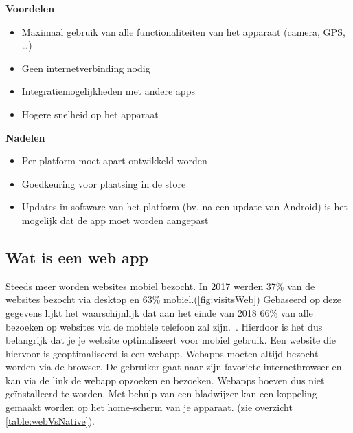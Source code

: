 \begin{minipage}[t]{0.5\textwidth}
	\textbf{Voordelen}
	\begin{itemize}  
		\item Maximaal gebruik van alle functionaliteiten van het apparaat (camera, GPS, \dots)
		\item Geen internetverbinding nodig
		\item Integratiemogelijkheden met andere apps
		\item Hogere snelheid op het apparaat
	\end{itemize}
\end{minipage}
\begin{minipage}[t]{0.5\textwidth}
		\textbf{Nadelen}
	\begin{itemize}  
		\item Per platform moet apart ontwikkeld worden
		\item Goedkeuring voor plaatsing in de store
		\item Updates in software van het platform (bv. na een update van Android) is het mogelijk dat de app moet worden aangepast
\end{itemize}
\end{minipage}


\subsection{Wat is een web app}
Steeds meer worden websites mobiel bezocht. In 2017 werden 37\% van de websites bezocht via desktop en 63\% mobiel.(\ref{fig:visitsWeb}) Gebaseerd op deze gegevens lijkt het waarschijnlijk dat aan het einde van 2018 66\% van alle bezoeken op websites via de mobiele telefoon zal zijn.~\autocite{traffic}. Hierdoor is het dus belangrijk dat je je website optimaliseert voor mobiel gebruik. Een website die hiervoor is geoptimaliseerd is een webapp. Webapps moeten altijd bezocht worden via de browser. De gebruiker gaat naar zijn favoriete internetbrowser en kan via de link de webapp opzoeken en bezoeken. Webapps hoeven dus niet geïnstalleerd te worden. Met behulp van een bladwijzer kan een koppeling gemaakt worden op het home-scherm van je apparaat. (zie overzicht \ref{table:webVsNative}).


